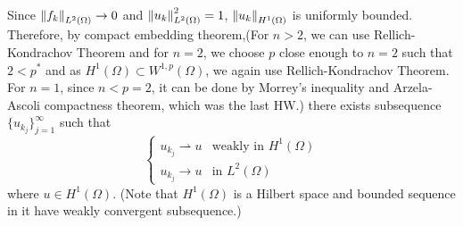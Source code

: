 \documentclass{article}
\begin{document}
Since $\norm{f_k}_{L^2(\Omega)}\rightarrow 0$ and $\norm{u_k}^2_{L^2(\Omega)}=1$, $\norm{u_k}_{H^1(\Omega)}$ is uniformly bounded. Therefore, by compact embedding theorem,(For $n>2$, we can use Rellich-Kondrachov Theorem and for $n=2$, we choose $p$ close enough to $n=2$ such that $2<p^*$ and as $H^1(\Omega)\subset W^{1,p}(\Omega)$, we again use Rellich-Kondrachov Theorem. For $n=1$, since $n<p=2$, it can be done by Morrey's inequality and Arzela-Ascoli compactness theorem, which was the last HW.) there exists subsequence $\{u_{k_j}\}_{j=1}^\infty$ such that
\begin{equation*}
\begin{cases}
u_{k_j}\rightharpoonup u & \text{weakly in }H^1(\Omega) \\
u_{k_j}\rightarrow u & \text{in }L^2(\Omega)
\end{cases}
\end{equation*}
where $u\in H^1(\Omega)$. (Note that $H^1(\Omega)$ is a Hilbert space and bounded sequence in it have weakly convergent subsequence.)
\end{document}
